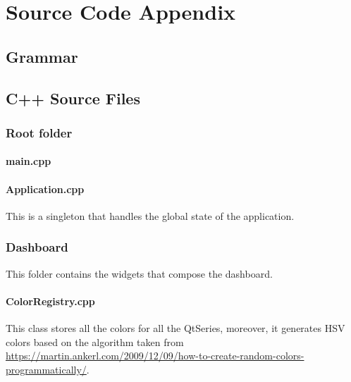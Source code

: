 
\part{Source Code Appendix}

\chapter{Grammar} \label{code:grammar}



\chapter{C++ Source Files}

\section{Root folder}

\subsection{main.cpp}


\subsection{Application.cpp}

This is a singleton that handles the global state of the application.



\section{Dashboard}
This folder contains the widgets that compose the dashboard.

\subsection{ColorRegistry.cpp} \label{code:coder}
\sloppy This class stores all the colors for all the QtSeries, moreover, it generates HSV colors based on the algorithm taken from \url{https://martin.ankerl.com/2009/12/09/how-to-create-random-colors-programmatically/}.


